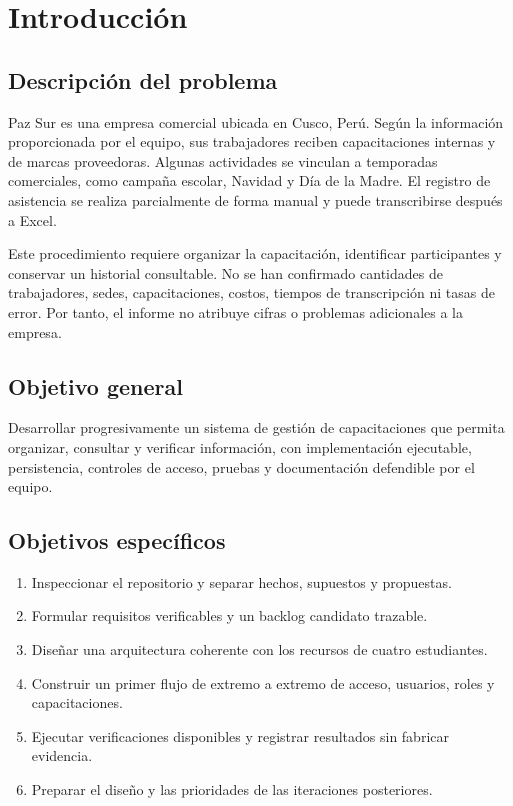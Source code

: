 \chapter{Introducción}
\section{Descripción del problema}
Paz Sur es una empresa comercial ubicada en Cusco, Perú. Según la información proporcionada por el equipo, sus trabajadores reciben capacitaciones internas y de marcas proveedoras. Algunas actividades se vinculan a temporadas comerciales, como campaña escolar, Navidad y Día de la Madre. El registro de asistencia se realiza parcialmente de forma manual y puede transcribirse después a Excel.

Este procedimiento requiere organizar la capacitación, identificar participantes y conservar un historial consultable. No se han confirmado cantidades de trabajadores, sedes, capacitaciones, costos, tiempos de transcripción ni tasas de error. Por tanto, el informe no atribuye cifras o problemas adicionales a la empresa.

\section{Objetivo general}
Desarrollar progresivamente un sistema de gestión de capacitaciones que permita organizar, consultar y verificar información, con implementación ejecutable, persistencia, controles de acceso, pruebas y documentación defendible por el equipo.

\section{Objetivos específicos}
\begin{enumerate}
  \item Inspeccionar el repositorio y separar hechos, supuestos y propuestas.
  \item Formular requisitos verificables y un backlog candidato trazable.
  \item Diseñar una arquitectura coherente con los recursos de cuatro estudiantes.
  \item Construir un primer flujo de extremo a extremo de acceso, usuarios, roles y capacitaciones.
  \item Ejecutar verificaciones disponibles y registrar resultados sin fabricar evidencia.
  \item Preparar el diseño y las prioridades de las iteraciones posteriores.
\end{enumerate}

